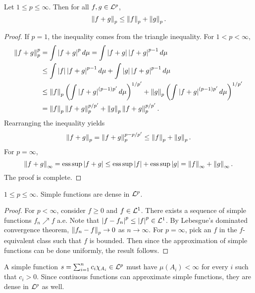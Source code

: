 \begin{theorem}
    Let $1\leq p\leq\infty$. Then for all $f,g\in\mathcal{L}^p$, 
    \begin{equation*}
        \left\lVert {f+g} \right\rVert_p \leq \left\lVert {f} \right\rVert_p + \left\lVert {g} \right\rVert_p.
    \end{equation*}
\end{theorem}
\begin{proof}
    If $p = 1$, the inequality comes from the triangle inequality. 
    For $1<p<\infty$, 
    \begin{equation*}
        \begin{split}
            \norm{f+g}_p^p &= \int \abs{f+g}^pd\mu 
            = \int \abs{f+g}\abs{f+g}^{p-1}d\mu \\
            &\leq \int \abs{f}\abs{f+g}^{p-1}d\mu + \int \abs{g}\abs{f+g}^{p-1}d\mu \\
            &\leq \norm{f}_p\pth{\int \abs{f+g}^{(p-1)p'}d\mu}^{1/p'} + \norm{g}_p\pth{\int \abs{f+g}^{(p-1)p'}d\mu}^{1/p'} \\
            &= \norm{f}_p\norm{f+g}_p^{p/p'} + \norm{g}_p\norm{f+g}_p^{p/p'}.
        \end{split}
    \end{equation*}
    Rearranging the inequality yields 
    \begin{equation*}
        \left\lVert {f+g} \right\rVert_p = \left\lVert {f+g} \right\rVert_p^{p-p/p'} \leq \left\lVert {f} \right\rVert_p + \left\lVert {g} \right\rVert_p.
    \end{equation*}
    For $p = \infty$, 
    \begin{equation*}
        \left\lVert {f+g} \right\rVert_\infty = \operatorname{ess\,sup} \left\lvert {f+g} \right\rvert \leq \operatorname{ess\,sup} \left\lvert {f} \right\rvert + \operatorname{ess\,sup} \left\lvert {g} \right\rvert = \left\lVert {f} \right\rVert_\infty + \left\lVert {g} \right\rVert_\infty.
    \end{equation*}
    The proof is complete.
\end{proof}

\begin{theorem}
    $1\leq p\leq \infty$. Simple functions are dense in $\mathcal{L}^p$.
\end{theorem}
\begin{proof}
    For $p<\infty$, consider $f\geq 0$ and $f\in\mathcal{L}^1$. There exists a 
    sequence of simple functions $f_n\nearrow f$ a.e. Note that 
    $\left\lvert {f-f_n} \right\rvert^p\leq\left\lvert {f} \right\rvert^p\in\mathcal{L}^1$. By Lebesgue's dominated 
    convergence theorem, $\left\lVert {f_n-f} \right\rVert_p\to 0$ as $n\to\infty$. 
    For $p=\infty$, pick an $f$ in the $f$-equivalent class 
    such that $f$ is bounded. Then since the approximation of 
    simple functions can be done uniformly, the result follows.
\end{proof}
\begin{remark}
    A simple function $s = \sum_{i=1}^n c_i\chi_{A_i}\in\mathcal{L}^p$ must have 
    $\mu(A_i)<\infty$ for every $i$ such that $c_i > 0$. Since 
    contiuous functions can approximate simple functions, 
    they are dense in $\mathcal{L}^p$ as well.
\end{remark}

